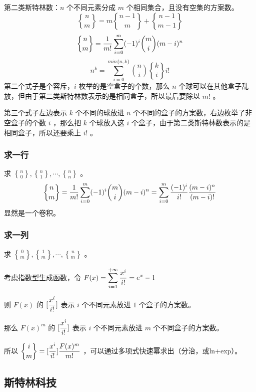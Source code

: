 第二类斯特林数：$n$ 个不同元素分成 $m$ 个相同集合，且没有空集的方案数。
$$
{n\brace m}=m{n-1\brace m}+{n-1\brace m-1}
$$
$$
{n\brace m}={1\over m!}\sum_{i=0}^{m}(-1)^i{m\choose i}(m-i)^n
$$
$$
n^k=\sum_{i=0}^{min\{n,k\}}{n\choose i}{k\brace i}i!
$$
第二个式子是个容斥，$i$ 枚举的是空盒子的个数，那么 $n$ 个球可以在其他盒子乱放，但由于第二类斯特林数表示的是相同盒子，所以最后要除以 $m!$ 。

第三个式子左边表示 $k$ 个不同的球放进 $n$ 个不同的盒子的方案数，右边枚举了非空盒子的个数 $i$ ，那么把 $k$ 个球放入这 $i$ 个盒子，由于第二类斯特林数表示的是相同盒子，所以还要乘上 $i!$ 。

\newpage

\subsubsection{求一行}

求 ${n\brace 0},{n\brace 1},\cdots,{n\brace n}$ 。
$$
{n\brace m}={1\over m!}\sum_{i=0}^{m}(-1)^i{m\choose i}(m-i)^n=\sum_{i=0}^{m}{(-1)^i\over i!}{(m-i)^n\over (m-i)!}
$$
显然是一个卷积。



\subsubsection{求一列}

求 ${0\brace m},{1\brace m},\cdots,{n\brace m}$ 。

考虑指数型生成函数，令 $\displaystyle F(x)=\sum_{i=1}^{+\infty}{x^i\over i!}=e^x-1$

则 $F(x)$ 的 $\displaystyle [{x^i\over i!}]$ 表示 $i$ 个不同元素放进 $1$ 个盒子的方案数。

那么 $F(x)^m$ 的 $\displaystyle [{x^i\over i!}]$ 表示 $i$ 个不同元素放进 $m$ 个不同盒子的方案数。

\vspace{0.2cm}

所以 $\displaystyle {i\brace m}=[{x^i\over i!}]{F(x)^m\over m!}$ ，可以通过多项式快速幂求出（分治，或ln+exp）。

\vspace{0.4cm}



\newpage

\subsection{斯特林科技}

